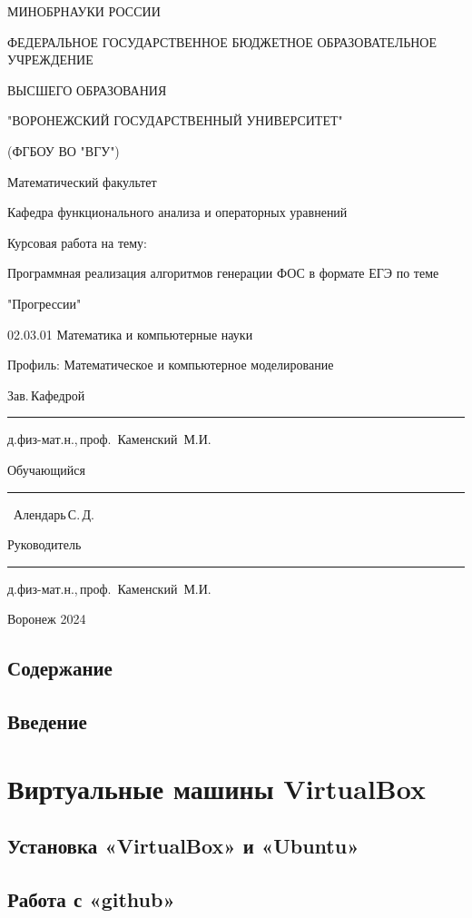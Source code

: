 \documentclass[oneside,final,12pt]{extarticle} %
\begin{document}
\begin{titlepage}
\centerline{МИНОБРНАУКИ РОССИИ}
\centerline{ФЕДЕРАЛЬНОЕ ГОСУДАРСТВЕННОЕ БЮДЖЕТНОЕ ОБРАЗОВАТЕЛЬНОЕ УЧРЕЖДЕНИЕ}
\centerline{ВЫСШЕГО ОБРАЗОВАНИЯ}
\centerline{"ВОРОНЕЖСКИЙ ГОСУДАРСТВЕННЫЙ УНИВЕРСИТЕТ"}
\centerline{(ФГБОУ ВО "ВГУ")}
\vfill
\centerline{Математический факультет}
\centerline{Кафедра функционального анализа и операторных уравнений}
\vfill
\centerline{Курсовая работа на тему:}
\centerline{Программная реализация алгоритмов генерации ФОС в формате ЕГЭ по теме}
\centerline{"Прогрессии"}
\centerline{02.03.01 Математика и компьютерные науки}
\centerline{Профиль: Математическое и компьютерное моделирование}
\vfill
\null\hfill
\begin{minipage}{0.85\textwidth}
	Зав.\,Кафедрой\,
	\rule{1.5cm}{0.25pt} д.физ-мат.н.,\,проф.\, Каменский~М.И.
	\par
	\medskip
	Обучающийся\,
	\rule{1.5cm}{0.25pt} \qquad\qquad\qquad\qquad\quad\quad\ Алендарь\,С.\,Д.
	\par
	\medskip
	Руководитель\,
	\rule{1.5cm}{0.25pt} д.физ-мат.н.,\,проф.\, Каменский~М.И.
	\par
	\medskip
\end{minipage}
\vfill
\centerline{Воронеж 2024}
\end{titlepage}
\setcounter{page}{2}

\section*{Содержание}

\newpage

\section*{Введение}
\newpage

\chapter{Виртуальные машины VirtualBox}
\section{Установка «VirtualBox» и «Ubuntu»}

%

\newpage
\section{Работа с «github»}
%
\newpage
\end{document}
